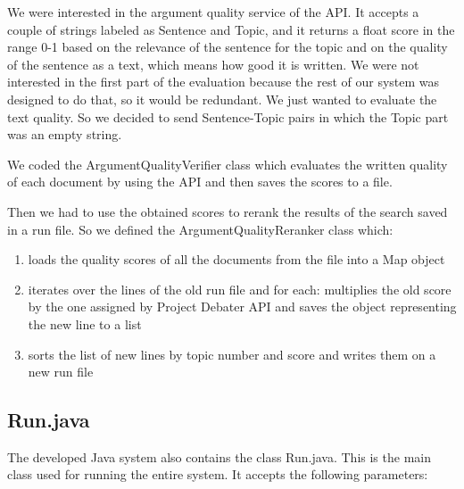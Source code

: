       We were interested in the argument quality service of the API. It accepts a couple of strings labeled as Sentence and Topic, and it returns a float score in the range 0-1 based on the relevance of the sentence for the topic and on the quality of the sentence as a text, which means how good it is written. We were not interested in the first part of the evaluation because the rest of our system was designed to do that, so it would be redundant. We just wanted to evaluate the text quality. So we decided to send Sentence-Topic pairs in which the Topic part was an empty string.
      
      We coded the ArgumentQualityVerifier class which evaluates the written quality of each document by using the API and then saves the scores to a file.
      
      Then we had to use the obtained scores to rerank the results of the search saved in a run file. So we defined the ArgumentQualityReranker class which:
      
       \begin{enumerate} 
           \item loads the quality scores of all the documents from the file into a Map object \item iterates over the lines of the old run file and for each: multiplies the old score by the one assigned by Project Debater API and saves the object representing the new line to a list \item sorts the list of new lines by topic number and score and writes them on a new run file 
       \end{enumerate}

\subsection{Run.java}

The developed Java system also contains the class Run.java. This is the main class used for running the entire system. It accepts the following parameters: 

